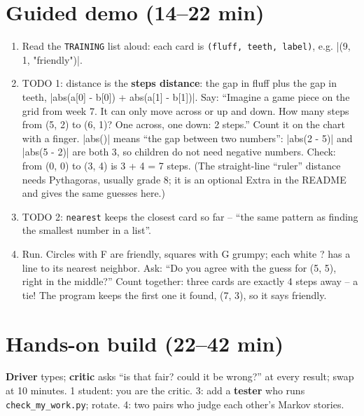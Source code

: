 \section{Guided demo (14--22 min)}
\begin{workedexample}
\begin{enumerate}[itemsep=1pt]
  \item Read the \texttt{TRAINING} list aloud: each card is \texttt{(fluff, teeth, label)}, e.g. \py|(9, 1, "friendly")|.
  \item TODO 1: distance is the \textbf{steps distance}: the gap in fluff plus the gap in teeth, \py|abs(a[0] - b[0]) + abs(a[1] - b[1])|. Say: \enquote{Imagine a game piece on the grid from week 7. It can only move across or up and down. How many steps from (5, 2) to (6, 1)? One across, one down: 2 steps.} Count it on the chart with a finger. \py|abs()| means \enquote{the gap between two numbers}: \py|abs(2 - 5)| and \py|abs(5 - 2)| are both 3, so children do not need negative numbers. Check: from (0, 0) to (3, 4) is 3 + 4 = 7 steps. (The straight-line \enquote{ruler} distance needs Pythagoras, usually grade 8; it is an optional Extra in the README and gives the same guesses here.)
  \item TODO 2: \texttt{nearest} keeps the closest card so far -- \enquote{the same pattern as finding the smallest number in a list}.
  \item Run. Circles with F are friendly, squares with G grumpy; each white ? has a line to its nearest neighbor. Ask: \enquote{Do you agree with the guess for (5, 5), right in the middle?} Count together: three cards are exactly 4 steps away -- a tie! The program keeps the first one it found, (7, 3), so it says friendly.
\end{enumerate}
\end{workedexample}

\section{Hands-on build (22--42 min)}
\begin{pairroles}
\textbf{Driver} types; \textbf{critic} asks \enquote{is that fair? could it be wrong?} at every result; swap at 10 minutes. 1 student: you are the critic. 3: add a \textbf{tester} who runs \texttt{check\_my\_work.py}; rotate. 4: two pairs who judge each other's Markov stories.
\end{pairroles}


